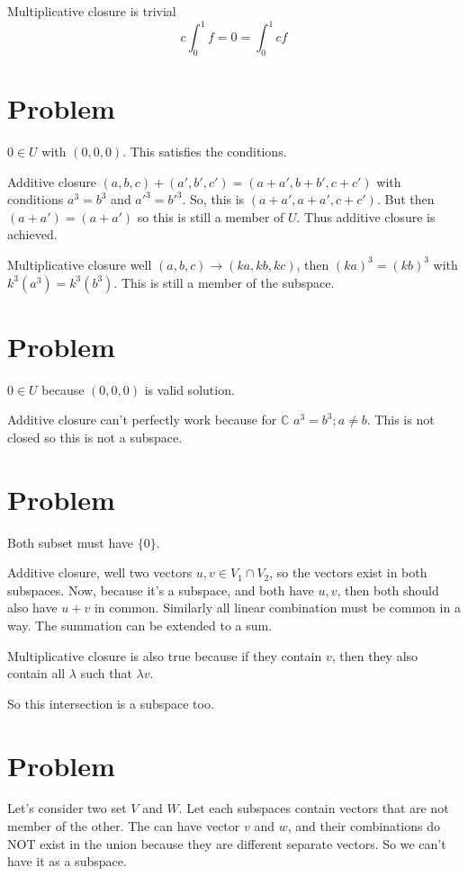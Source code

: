 \documentclass[letter]{article}
\begin{document}
Multiplicative closure is trivial
\[
c\int_0^{1} f = 0 = \int_0^{1} cf
\] 


\section{Problem} 
$0 \in U$ with $(0,0,0)$. This satisfies the conditions. 

Additive closure $(a,b,c)+(a',b',c')=(a+a', b+b', c+c')$ with conditions $a^3 = b^3$ and $a'^3=b'^3$. So, this is $(a+a', a+a', c+c')$. But then $(a+a') = (a+a')$ so this is still a member of $U$. Thus additive closure is achieved.

Multiplicative closure well $(a,b,c) \to (ka,kb,kc)$, then $(ka)^3 = (kb)^3$ with $k^3 (a^3) = k^3 (b^3)$. This is still a member of the subspace. 

\section{Problem}
$0 \in U$ because $(0,0,0)$ is valid solution. 

Additive closure can't perfectly work because for $\mathbb{C}$ $a^3 = b^3; a \neq b$. This is not closed so this is not a subspace. 

\section{Problem}
Both subset must have $\{0\} $. 

Additive closure, well two vectors $u,v \in V_1 \cap V_2$, so the vectors exist in both subspaces. Now, because it's a subspace, and both have $u,v$, then both should also have $u+v$ in common. Similarly all linear combination must be common in a way. The summation can be extended to a sum. 

Multiplicative closure is also true because if they contain $v$, then they also contain all $\lambda$ such that $\lambda {v}$.

So this intersection is a subspace too. 

\section{Problem} 
Let's consider two set $V$ and $W$. Let each subspaces contain vectors that are not member of the other. The can have vector $v$ and $w$, and their combinations do NOT exist in the union because they are different separate vectors. So we can't have it as a subspace. 
\end{document}

